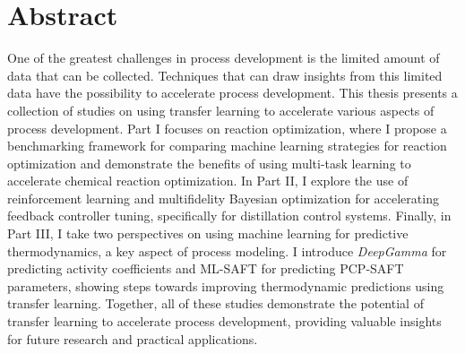 \begingroup
\let\clearpage\relax
\let\cleardoublepage\relax
\let\cleardoublepage\relax

\chapter*{Abstract}

One of the greatest challenges in process development is the limited amount of data that can be collected. Techniques that can draw insights from this limited data have the possibility to accelerate process development. This thesis presents a collection of studies on using transfer learning to accelerate various aspects of process development. Part I focuses on reaction optimization, where I propose a benchmarking framework for comparing machine learning strategies for reaction optimization and demonstrate the benefits of using multi-task learning to accelerate chemical reaction optimization. In Part II, I explore the use of reinforcement learning and multifidelity Bayesian optimization for accelerating feedback controller tuning, specifically for distillation control systems. Finally, in Part III, I take two perspectives on using machine learning for predictive thermodynamics, a key aspect of process modeling. I introduce \textit{DeepGamma} for predicting activity coefficients and ML-SAFT for predicting PCP-SAFT parameters, showing steps towards improving thermodynamic predictions using transfer learning. Together, all of these studies demonstrate the potential of transfer learning to accelerate process development, providing valuable insights for future research and practical applications.

\vfill

\endgroup			

\vfill